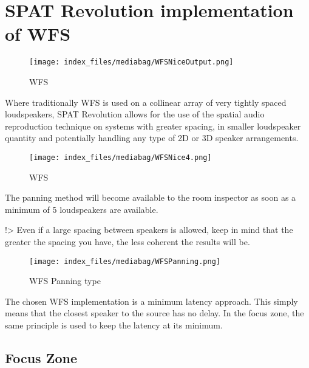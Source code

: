 \documentclass[
  letterpaper,
  DIV=11,
  numbers=noendperiod]{scrreport}
\begin{document}
\hypertarget{spat-revolution-implementation-of-wfs}{%
\section{SPAT Revolution implementation of
WFS}\label{spat-revolution-implementation-of-wfs}}

\begin{figure}

{\centering \texttt{[image: index\_files/mediabag/WFSNiceOutput.png]}

}

\caption{WFS}

\end{figure}

Where traditionally WFS is used on a collinear array of very tightly
spaced loudspeakers, SPAT Revolution allows for the use of the spatial
audio reproduction technique on systems with greater spacing, in smaller
loudspeaker quantity and potentially handling any type of 2D or 3D
speaker arrangements.

\begin{figure}

{\centering \texttt{[image: index\_files/mediabag/WFSNice4.png]}

}

\caption{WFS}

\end{figure}

The panning method will become available to the room inspector as soon
as a minimum of 5 loudspeakers are available.

!\textgreater{} Even if a large spacing between speakers is allowed,
keep in mind that the greater the spacing you have, the less coherent
the results will be.

\begin{figure}

{\centering \texttt{[image: index\_files/mediabag/WFSPanning.png]}

}

\caption{WFS Panning type}

\end{figure}

The chosen WFS implementation is a minimum latency approach. This simply
means that the closest speaker to the source has no delay. In the focus
zone, the same principle is used to keep the latency at its minimum.

\hypertarget{focus-zone}{%
\subsection{Focus Zone}\label{focus-zone}}
\end{document}
